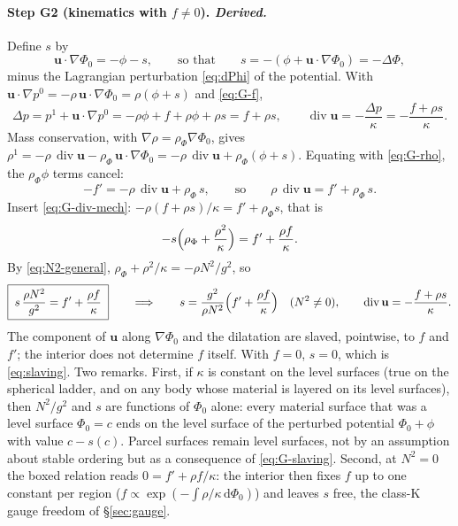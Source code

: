 \documentclass[11pt]{article}
\newcommand{\bu}{\mathbf{u}}
\newcommand{\Div}{\operatorname{div}}
\begin{document}
\paragraph{Step G2 (kinematics with $f \neq 0$). \emph{Derived.}}
Define $s$ by
\begin{equation}
  \bu\cdot\nabla\Phi_0 = -\phi - s,
  \qquad\text{so that}\qquad
  s = -(\phi + \bu\cdot\nabla\Phi_0) = -\Delta\Phi ,
  \label{eq:G-s}
\end{equation}
minus the Lagrangian perturbation \eqref{eq:dPhi} of the potential. With
$\bu\cdot\nabla p^0 = -\rho\,\bu\cdot\nabla\Phi_0 = \rho(\phi + s)$ and
\eqref{eq:G-f},
\begin{equation}
  \Delta p = p^1 + \bu\cdot\nabla p^0 = -\rho\phi + f + \rho\phi + \rho s
  = f + \rho s ,
  \qquad
  \Div\bu = -\frac{\Delta p}{\kappa} = -\frac{f + \rho s}{\kappa} .
  \label{eq:G-div-mech}
\end{equation}
Mass conservation, with $\nabla\rho = \rho_\Phi\nabla\Phi_0$, gives
$\rho^1 = -\rho\,\Div\bu - \rho_\Phi\,\bu\cdot\nabla\Phi_0
= -\rho\,\Div\bu + \rho_\Phi(\phi + s)$. Equating with
\eqref{eq:G-rho}, the $\rho_\Phi\phi$ terms cancel:
\begin{equation}
  -f' = -\rho\,\Div\bu + \rho_\Phi\, s,
  \qquad\text{so}\qquad
  \rho\,\Div\bu = f' + \rho_\Phi\, s .
  \label{eq:G-div-kin}
\end{equation}
Insert \eqref{eq:G-div-mech}:
$-\rho(f + \rho s)/\kappa = f' + \rho_\Phi s$, that is
\begin{equation}
  -s\Bigl(\rho_\Phi + \frac{\rho^2}{\kappa}\Bigr) = f' + \frac{\rho f}{\kappa} .
\end{equation}
By \eqref{eq:N2-general}, $\rho_\Phi + \rho^2/\kappa = -\rho N^2/g^2$, so
\begin{equation}
  \boxed{\;s\,\frac{\rho N^2}{g^2} = f' + \frac{\rho f}{\kappa}\;}
  \qquad\Longrightarrow\qquad
  s = \frac{g^2}{\rho N^2}\Bigl(f' + \frac{\rho f}{\kappa}\Bigr)
  \quad (N^2 \neq 0),
  \qquad
  \Div\bu = -\frac{f + \rho s}{\kappa} .
  \label{eq:G-slaving}
\end{equation}
The component of $\bu$ along $\nabla\Phi_0$ and the dilatation are
slaved, pointwise, to $f$ and $f'$; the interior does not determine
$f$ itself. With $f = 0$, $s = 0$, which is \eqref{eq:slaving}. Two
remarks. First, if $\kappa$ is constant on the level surfaces (true on
the spherical ladder, and on any body whose material is layered on its
level surfaces), then $N^2/g^2$ and $s$ are functions of $\Phi_0$ alone:
every material surface that was a level surface $\Phi_0 = c$ ends on
the level surface of the perturbed potential $\Phi_0 + \phi$ with value
$c - s(c)$. Parcel surfaces remain level surfaces, not by an assumption
about stable ordering but as a consequence of
\eqref{eq:G-slaving}. Second, at $N^2 = 0$ the boxed relation reads
$0 = f' + \rho f/\kappa$: the interior then fixes $f$ up to one
constant per region ($f \propto \exp(-\int\rho/\kappa\,\mathrm d\Phi_0)$)
and leaves $s$ free, the class-K gauge freedom of \S\ref{sec:gauge}.
\end{document}
